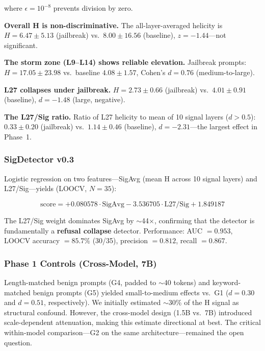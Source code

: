 \documentclass[12pt,a4paper]{article}
\begin{document}
where $\epsilon = 10^{-8}$ prevents division by zero.



\textbf{Overall H is non-discriminative.} The all-layer-averaged helicity is $H = 6.47 \pm 5.13$ (jailbreak) vs.~$8.00 \pm 16.56$ (baseline), $z = -1.44$---not significant.

\textbf{The storm zone (L9--L14) shows reliable elevation.} Jailbreak prompts: $H = 17.05 \pm 23.98$ vs.~baseline $4.08 \pm 1.57$, Cohen's $d = 0.76$ (medium-to-large).

\textbf{L27 collapses under jailbreak.} $H = 2.73 \pm 0.66$ (jailbreak) vs.~$4.01 \pm 0.91$ (baseline), $d = -1.48$ (large, negative).

\textbf{The L27/Sig ratio.} Ratio of L27 helicity to mean of 10 signal layers ($d > 0.5$): $0.33 \pm 0.20$ (jailbreak) vs.~$1.14 \pm 0.46$ (baseline), $d = -2.31$---the largest effect in Phase~1.

\subsubsection{SigDetector v0.3}

Logistic regression on two features---SigAvg (mean H across 10 signal layers) and L27/Sig---yields (LOOCV, $N=35$):

\begin{equation}
    \text{score} = +0.080578 \cdot \text{SigAvg} - 3.536705 \cdot \text{L27/Sig} + 1.849187
    \label{eq:detector}
\end{equation}



The L27/Sig weight dominates SigAvg by $\sim$44$\times$, confirming that the detector is fundamentally a \textbf{refusal collapse} detector. Performance: AUC $= 0.953$, LOOCV accuracy $= 85.7\%$ (30/35), precision $= 0.812$, recall $= 0.867$.

\subsubsection{Phase 1 Controls (Cross-Model, 7B)}

Length-matched benign prompts (G4, padded to $\sim$40 tokens) and keyword-matched benign prompts (G5) yielded small-to-medium effects vs.~G1 ($d = 0.30$ and $d = 0.51$, respectively). We initially estimated $\sim$30\% of the H signal as structural confound. However, the cross-model design (1.5B vs.~7B) introduced scale-dependent attenuation, making this estimate directional at best. The critical within-model comparison---G2 on the same architecture---remained the open question.
\end{document}
